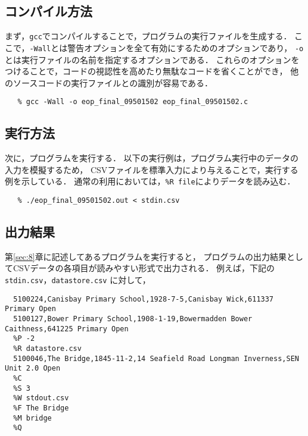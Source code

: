 \documentclass[autodetect-engine,dvi=dvipdfmx,ja=standard,
               a4j,11pt]{bxjsarticle}
\begin{document}
\subsection{コンパイル方法}

まず，\verb|gcc|でコンパイルすることで，プログラムの実行ファイルを生成する．
ここで，\verb|-Wall|とは警告オプションを全て有効にするためのオプションであり，
\verb|-o|とは実行ファイルの名前を指定するオプションである．
これらのオプションをつけることで，コードの視認性を高めたり無駄なコードを省くことができ，
他のソースコードの実行ファイルとの識別が容易である．

{\fontsize{10pt}{11pt} \selectfont
 \begin{verbatim}
   % gcc -Wall -o eop_final_09501502 eop_final_09501502.c
 \end{verbatim}
}

\subsection{実行方法}

次に，プログラムを実行する．
以下の実行例は，プログラム実行中のデータの入力を模擬するため，
CSVファイルを標準入力により与えることで，実行する例を示している．
通常の利用においては，\verb|%R file|によりデータを読み込む．

{\fontsize{10pt}{11pt} \selectfont
 \begin{verbatim}
   % ./eop_final_09501502.out < stdin.csv
 \end{verbatim}
}

\subsection{出力結果}

第\ref{sec:8}章に記述してあるプログラムを実行すると，
プログラムの出力結果としてCSVデータの各項目が読みやすい形式で出力される．
例えば，下記の \verb|stdin.csv|，\verb|datastore.csv| に対して，

{\fontsize{10pt}{11pt} \selectfont
 \begin{verbatim}
  5100224,Canisbay Primary School,1928-7-5,Canisbay Wick,611337 Primary Open
  5100127,Bower Primary School,1908-1-19,Bowermadden Bower Caithness,641225 Primary Open
  %P -2
  %R datastore.csv
  5100046,The Bridge,1845-11-2,14 Seafield Road Longman Inverness,SEN Unit 2.0 Open
  %C
  %S 3
  %W stdout.csv
  %F The Bridge
  %M bridge
  %Q
 \end{verbatim}
}
\end{document}
